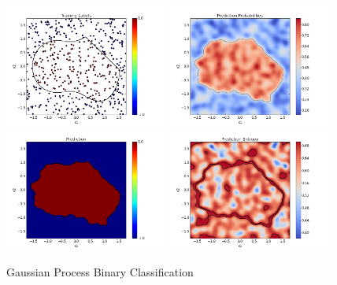 				\begin{figure}[!htbp]
					\centering
						\includegraphics[width=0.48\textwidth]{Figures/Progress/binary/Figure1.png}
						\includegraphics[width=0.48\textwidth]{Figures/Progress/binary/Figure2.png}
						\includegraphics[width=0.48\textwidth]{Figures/Progress/binary/Figure3.png}
						\includegraphics[width=0.48\textwidth]{Figures/Progress/binary/Figure4.png}
					\caption{Gaussian Process Binary Classification}
					\label{ProgressReport:GaussianProcessModels:Figure:binary}
				\end{figure}
							
